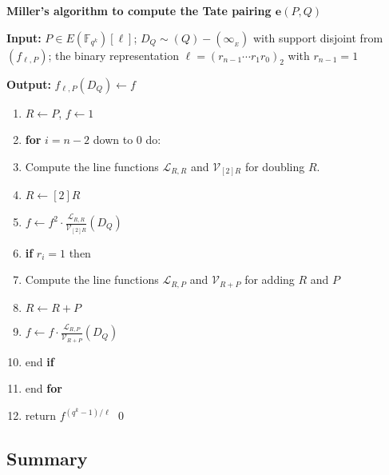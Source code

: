\documentclass[11pt, lettersize, notitlepage, leqno, footskip=0.6cm]{article}
\newcommand{\bFqk}{\mathbb{F}_{q^k}}
\newcommand{\mc}{\mathcal}
\newcommand{\e}{\mathbf{e}}
\newcommand{\vs}{\vspace{-2mm}}
\newcommand{\noin}{\noindent}
\numberwithin{equation}{section}
\begin{document}
\bigskip

\begin{mdframed} \textbf{Miller's algorithm to compute  the Tate pairing $\e(P,Q)$} \vspace{0.15cm}

\noin \textbf{Input:} $P\in E(\bFqk)[\ell]$; $D_Q\sim (Q)-(\infty_{_E})$ with support disjoint from $(f_{\ell,P})$; the binary representation $\ell = (r_{n-1}\cdots r_1 r_0)_2$ with $r_{n-1} = 1$ \vspace{0.15cm}

\noin \textbf{Output:} $f_{\ell,P}(D_Q)\gets f$ \vspace{0.15cm}

\begin{enumerate}[wide, labelwidth=!, labelindent=0pt]\vs \item $R\gets P$, $f\gets 1$

\item \textbf{for} $i = n-2$ down to $0$ do:

\item Compute the line functions $\mc{L}_{R,R}$ and $\mc{V}_{[2]R}$ for doubling $R$.

\item $R\gets [2]R$

\item $f\gets f^2\cdot \frac{\mc{L}_{R,R}}{\mc{V}_{[2]R}}(D_Q)$

\item \textbf{if} $r_i =1$ then 

\item Compute the line functions $\mc{L}_{R,P}$ and $\mc{V}_{R+P}$ for adding $R$ and $P$

\item $R\gets R+P$

\item $f\gets f\cdot \frac{\mc{L}_{R,P}}{\mc{V}_{R+P}}(D_Q)$

\item end \textbf{if}

\item end \textbf{for}

\item return $f^{(q^k-1)/{\ell}}$ \qed \end{enumerate} \end{mdframed}






\subsection{\fontsize{11}{11}\selectfont Summary}
\end{document}
